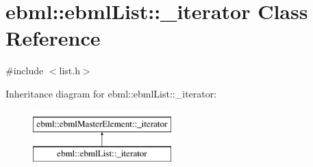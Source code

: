 \hypertarget{classebml_1_1ebmlList_1_1__iterator}{}\section{ebml\+:\+:ebml\+List\+:\+:\+\_\+iterator Class Reference}
\label{classebml_1_1ebmlList_1_1__iterator}


{\ttfamily \#include $<$list.\+h$>$}

Inheritance diagram for ebml\+:\+:ebml\+List\+:\+:\+\_\+iterator\+:\begin{figure}[H]
\begin{center}
\leavevmode
\includegraphics[height=2.000000cm]{classebml_1_1ebmlList_1_1__iterator}
\end{center}
\end{figure}
